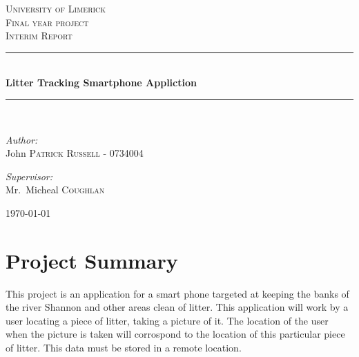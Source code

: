 \documentclass{article}
\newcommand{\HRule}{\rule{\linewidth}{0.5mm}}
\begin{document}
\begin{titlepage}

\begin{center}


   

\textsc{\LARGE University of Limerick}\\[1.5cm]

\textsc{\Large Final year project}\\[0.5cm]

\textsc{\Large Interim Report}\\[0.5cm]

\HRule \\[0.4cm]
{ \huge \bfseries Litter Tracking Smartphone Appliction}\\[0.4cm]

\HRule \\[1.5cm]

\begin{minipage}{0.4\textwidth}
\begin{flushleft} \large
\emph{Author:}\\
John \textsc{Patrick Russell - 0734004}
\end{flushleft}
\end{minipage}
\begin{minipage}{0.4\textwidth}
\begin{flushright} \large
\emph{Supervisor:} \\
Mr.~Micheal \textsc{Coughlan}
\end{flushright}
\end{minipage}

\vfill

{\large \today}

\end{center}

\end{titlepage}
\newpage
\tableofcontents
\newpage

\label{sec:Summary}
\section{Project Summary}
This project is an application for a smart phone targeted at keeping the banks of the river Shannon and other areas clean of litter. This application will work by a user locating a piece of litter, taking a picture of it. The location of the user when the picture is taken will corrospond to the location of this particular piece of litter. This data must be stored in a remote location.
\end{document}
